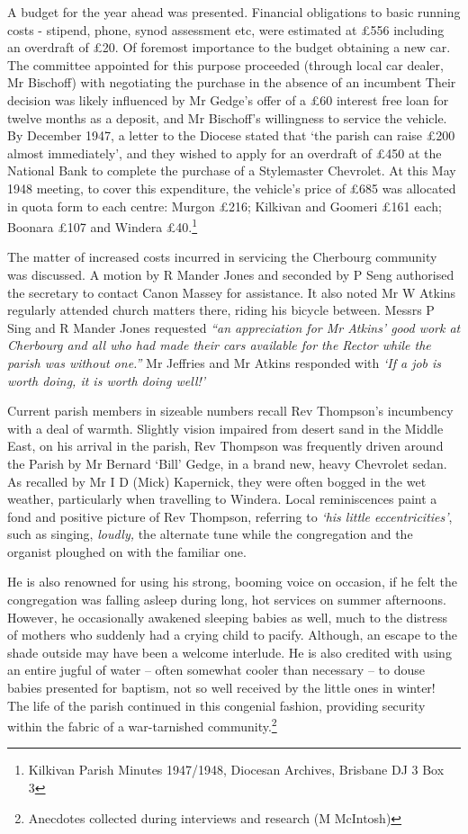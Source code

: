 A budget for the year ahead was presented. Financial obligations to basic running costs - stipend, phone, synod assessment etc, were estimated at £556 including an overdraft of £20. Of foremost importance to the budget obtaining a new car. The committee appointed for this purpose proceeded (through local car dealer, Mr Bischoff) with negotiating the purchase in the absence of an incumbent Their decision was likely influenced by Mr Gedge's offer of a £60 interest free loan for twelve months as a deposit, and Mr Bischoff's willingness to service the vehicle. By December 1947, a letter to the Diocese stated that `the parish can raise £200 almost immediately', and they wished to apply for an overdraft of £450 at the National Bank to complete the purchase of a Stylemaster Chevrolet. At this May 1948 meeting, to cover this expenditure, the vehicle's price of £685 was allocated in quota form to each centre: Murgon £216; Kilkivan and Goomeri £161 each; Boonara £107 and Windera £40.\footnote{Kilkivan Parish Minutes 1947/1948, Diocesan Archives, Brisbane DJ 3 Box 3}

The matter of increased costs incurred in servicing the Cherbourg community was discussed. A motion by R Mander Jones and seconded by P Seng authorised the secretary to contact Canon Massey for assistance. It also noted Mr W Atkins regularly attended church matters there, riding his bicycle between. Messrs P Sing and R Mander Jones requested \emph{``an appreciation for Mr Atkins' good work at Cherbourg and all who had made their cars available for the Rector while the parish was without one.''} Mr Jeffries and Mr Atkins responded with \emph{`If a job is worth doing, it is worth doing well!'}

Current parish members in sizeable numbers recall Rev Thompson's incumbency with a deal of warmth. Slightly vision impaired from desert sand in the Middle East, on his arrival in the parish, Rev Thompson was frequently driven around the Parish by Mr Bernard `Bill' Gedge, in a brand new, heavy Chevrolet sedan. As recalled by Mr I D (Mick) Kapernick, they were often bogged in the wet weather, particularly when travelling to Windera. Local reminiscences paint a fond and positive picture of Rev Thompson, referring to \emph{`his little eccentricities'}, such as singing, \emph{loudly,} the alternate tune while the congregation and the organist ploughed on with the familiar one.

He is also renowned for using his strong, booming voice on occasion, if he felt the congregation was falling asleep during long, hot services on summer afternoons. However, he occasionally awakened sleeping babies as well, much to the distress of mothers who suddenly had a crying child to pacify. Although, an escape to the shade outside may have been a welcome interlude. He is also credited with using an entire jugful of water -- often somewhat cooler than necessary -- to douse babies presented for baptism, not so well received by the little ones in winter! The life of the parish continued in this congenial fashion, providing security within the fabric of a war-tarnished community.\footnote{Anecdotes collected during interviews and research (M McIntosh)}

